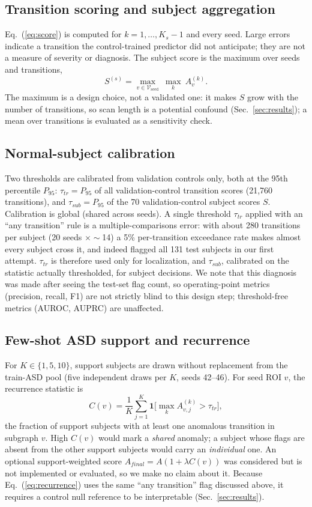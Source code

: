 \documentclass[conference]{IEEEtran}
\begin{document}
\subsection{Transition scoring and subject aggregation}
Eq.~(\ref{eq:score}) is computed for $k=1,\dots,K_s-1$ and every seed. Large errors indicate a transition the control-trained predictor did not anticipate; they are not a measure of severity or diagnosis. The subject score is the maximum over seeds and transitions,
\begin{equation}
S^{(s)}=\max_{v\in\mathcal{V}_{\mathrm{seed}}}\ \max_{k}\ A^{(k)}_v .
\label{eq:subject}
\end{equation}
The maximum is a design choice, not a validated one: it makes $S$ grow with the number of transitions, so scan length is a potential confound (Sec.~\ref{sec:results}); a mean over transitions is evaluated as a sensitivity check.

\subsection{Normal-subject calibration}
Two thresholds are calibrated from validation controls only, both at the 95th percentile $P_{95}$: $\tau_{tr}=P_{95}$ of all validation-control transition scores (21,760 transitions), and $\tau_{sub}=P_{95}$ of the 70 validation-control subject scores $S$. Calibration is global (shared across seeds). A single threshold $\tau_{tr}$ applied with an ``any transition'' rule is a multiple-comparisons error: with about 280 transitions per subject (20 seeds $\times\sim$14) a 5\% per-transition exceedance rate makes almost every subject cross it, and indeed flagged all 131 test subjects in our first attempt. $\tau_{tr}$ is therefore used only for localization, and $\tau_{sub}$, calibrated on the statistic actually thresholded, for subject decisions. We note that this diagnosis was made after seeing the test-set flag count, so operating-point metrics (precision, recall, F1) are not strictly blind to this design step; threshold-free metrics (AUROC, AUPRC) are unaffected.

\subsection{Few-shot ASD support and recurrence}
For $K\in\{1,5,10\}$, support subjects are drawn without replacement from the train-ASD pool (five independent draws per $K$, seeds 42--46). For seed ROI $v$, the recurrence statistic is
\begin{equation}
C(v)=\frac{1}{K}\sum_{j=1}^{K}\mathbf{1}\bigl[\max_k A^{(k)}_{v,j}>\tau_{tr}\bigr],
\label{eq:recurrence}
\end{equation}
the fraction of support subjects with at least one anomalous transition in subgraph $v$. High $C(v)$ would mark a \emph{shared} anomaly; a subject whose flags are absent from the other support subjects would carry an \emph{individual} one. An optional support-weighted score $A_{final}=A(1+\lambda C(v))$ was considered but is not implemented or evaluated, so we make no claim about it. Because Eq.~(\ref{eq:recurrence}) uses the same ``any transition'' flag discussed above, it requires a control null reference to be interpretable (Sec.~\ref{sec:results}).
\end{document}
